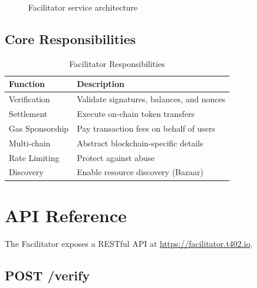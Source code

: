 \begin{figure}[htbp]
\caption{Facilitator service architecture}
\label{fig:facilitator-architecture}
\end{figure}

\subsection{Core Responsibilities}

\begin{table}[htbp]
\centering
\caption{Facilitator Responsibilities}
\label{tab:facilitator-responsibilities}
\begin{tabular}{l p{7cm}}
\toprule
\textbf{Function} & \textbf{Description} \\
\midrule
Verification & Validate signatures, balances, and nonces \\
Settlement & Execute on-chain token transfers \\
Gas Sponsorship & Pay transaction fees on behalf of users \\
Multi-chain & Abstract blockchain-specific details \\
Rate Limiting & Protect against abuse \\
Discovery & Enable resource discovery (Bazaar) \\
\bottomrule
\end{tabular}
\end{table}

\section{API Reference}
\label{sec:facilitator-api}

The Facilitator exposes a RESTful API at \url{https://facilitator.t402.io}.

\subsection{POST /verify}
\label{subsec:verify-endpoint}


